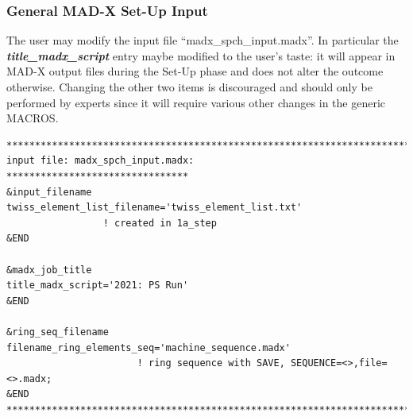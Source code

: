 \subsubsection{General MAD-X Set-Up Input}\label{APPENDIX2}
The user may modify the input file ``madx\_spch\_input.madx''. In
particular the {\it\bf title\_madx\_script} entry maybe modified to
the user's taste: it will appear in MAD-X output files during the
Set-Up phase and does not alter the outcome otherwise. Changing the
other two items is discouraged and should only be performed by experts
since it will require various other changes in the generic MACROS.
\begin{verbatim}
*****************************************************************************
input file: madx_spch_input.madx:
********************************
&input_filename
twiss_element_list_filename='twiss_element_list.txt'
                 ! created in 1a_step
&END

&madx_job_title
title_madx_script='2021: PS Run'
&END

&ring_seq_filename
filename_ring_elements_seq='machine_sequence.madx'
                       ! ring sequence with SAVE, SEQUENCE=<>,file=<>.madx;
&END
*****************************************************************************
\end{verbatim}

